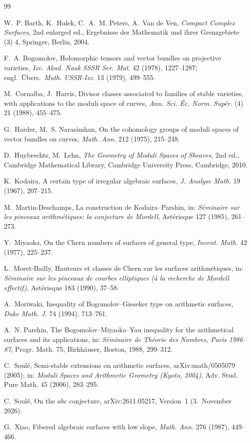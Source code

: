 \documentclass[11pt]{article}
\theoremstyle{definition}
\theoremstyle{remark}
\begin{document}
{}
\begin{thebibliography}{99}
\small
\frenchspacing

W.~P. Barth, K.~Hulek, C.~A.~M. Peters, A.~Van de Ven,
\emph{Compact Complex Surfaces}, 2nd enlarged ed.,
Ergebnisse der Mathematik und ihrer Grenzgebiete (3) 4, Springer, Berlin, 2004.

F.~A. Bogomolov,
Holomorphic tensors and vector bundles on projective varieties,
\emph{Izv. Akad. Nauk SSSR Ser. Mat.} 42 (1978), 1227--1287;
engl.\ Übers.\ \emph{Math. USSR-Izv.} 13 (1979), 499--555.

M.~Cornalba, J.~Harris,
Divisor classes associated to families of stable varieties, with applications
to the moduli space of curves,
\emph{Ann. Sci. \'Ec. Norm. Sup\'er.} (4) 21 (1988), 455--475.

G.~Harder, M.~S. Narasimhan,
On the cohomology groups of moduli spaces of vector bundles on curves,
\emph{Math. Ann.} 212 (1975), 215--248.

D.~Huybrechts, M.~Lehn,
\emph{The Geometry of Moduli Spaces of Sheaves}, 2nd ed.,
Cambridge Mathematical Library, Cambridge University Press, Cambridge, 2010.

K.~Kodaira,
A certain type of irregular algebraic surfaces,
\emph{J. Analyse Math.} 19 (1967), 207--215.

M.~Martin-Deschamps,
La construction de Kodaira--Parshin,
in: \emph{S\'eminaire sur les pinceaux arithm\'etiques: la conjecture de Mordell},
Ast\'erisque 127 (1985), 261--273.

Y.~Miyaoka,
On the Chern numbers of surfaces of general type,
\emph{Invent. Math.} 42 (1977), 225--237.

L.~Moret-Bailly,
Hauteurs et classes de Chern sur les surfaces arithm\'etiques,
in: \emph{S\'eminaire sur les pinceaux de courbes elliptiques (\`a la recherche
de \guillemotleft Mordell effectif\guillemotright)}, Ast\'erisque 183 (1990), 37--58.

A.~Moriwaki,
Inequality of Bogomolov--Gieseker type on arithmetic surfaces,
\emph{Duke Math. J.} 74 (1994), 713--761.

A.~N. Parshin,
The Bogomolov--Miyaoka--Yau inequality for the arithmetical surfaces and its
applications,
in: \emph{S\'eminaire de Th\'eorie des Nombres, Paris 1986--87},
Progr. Math. 75, Birkh\"auser, Boston, 1988, 299--312.

C.~Soul\'e,
Semi-stable extensions on arithmetic surfaces,
arXiv:math/0505079 (2005); in: \emph{Moduli Spaces and Arithmetic Geometry
(Kyoto, 2004)}, Adv. Stud. Pure Math. 45 (2006), 283--295.

C.~Soul\'e,
On the $abc$ conjecture,
arXiv:2611.05217, Version~1 (3.~November 2026).

G.~Xiao,
Fibered algebraic surfaces with low slope,
\emph{Math. Ann.} 276 (1987), 449--466.

\end{thebibliography}
\end{document}

